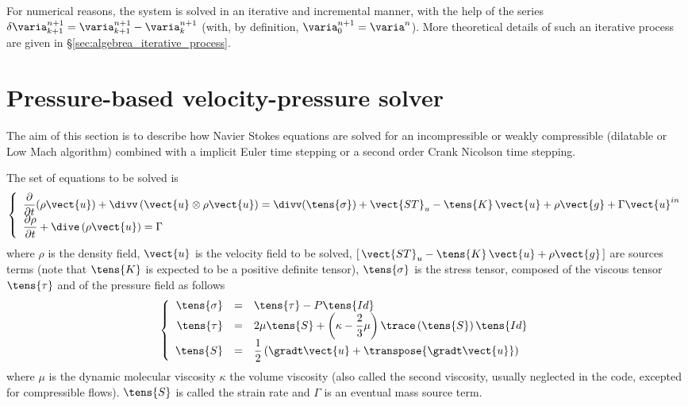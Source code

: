 For numerical reasons, the system is solved in an iterative and incremental
manner, with the help of the series $\delta \varia^{n+1}_{k+1}=\varia^{n+1}_{k+1}-\varia^{n+1}_{k}$ 
(with, by definition, $\varia^{n+1}_0=\varia^{n}$).
More theoretical details of such an iterative process are given in \S \ref{sec:algebrea_iterative_process}.

\section{Pressure-based velocity-pressure solver}
The aim of this section is to describe how Navier Stokes equations are solved for an incompressible 
or weakly compressible (dilatable or Low Mach algorithm) combined with a 
implicit Euler time stepping or a second order Crank Nicolson time stepping.

The set of equations to be solved is
\begin{equation}\label{eq:time_stepping_navier_stokes}
\left\{\begin{array}{l}
\displaystyle\frac{\partial}{\partial t}(\rho \vect{u}) + \divv\left( \vect{u} \otimes \rho\vect{u}  \right)
=\divv(\tens{\sigma}) + \vect{ST}_u - \tens{K}\,\vect{u} + \rho \vect{g} + \Gamma \vect{u}^{in}\\
\dfrac{\partial \rho}{\partial t} + \dive\left( \rho \vect{u} \right) = \Gamma
\end{array}\right.
\end{equation}
%
where $\rho$ is the density field, $\vect{u}$ is the velocity field to be solved,
$[\,\vect{ST}_u-\tens{K}\,\vect{u} + \rho \vect{g} \,]$  are sources terms (note that $\tens{K}$ is expected to be a positive definite tensor),
 $\tens{\sigma}$ is the stress tensor, composed of the viscous tensor $\tens{\tau}$ and of the pressure field as follows
\begin{equation}
\left\{\begin{array}{r c l}
\tens{\sigma} &=& \tens{\tau} - P\tens{Id}  \\%
\tens{\tau} & =& 2 \mu  \tens{S} +   \left( \kappa - \dfrac{2}{3}\mu \right)   \trace \left( \tens{S} \right) \tens{Id}\\
\tens{S} &=& \dfrac{1}{2} \left( \gradt \vect{u}+\transpose{\gradt\vect{u}} \right)
\end{array}\right.
\end{equation}
 where  $\mu$ is the dynamic molecular viscosity
 $\kappa$ the volume viscosity (also called the second viscosity, usually neglected in the code, excepted for compressible flows).
$\tens{S}$ is called the strain rate and  $\Gamma$ is an eventual mass source term.

